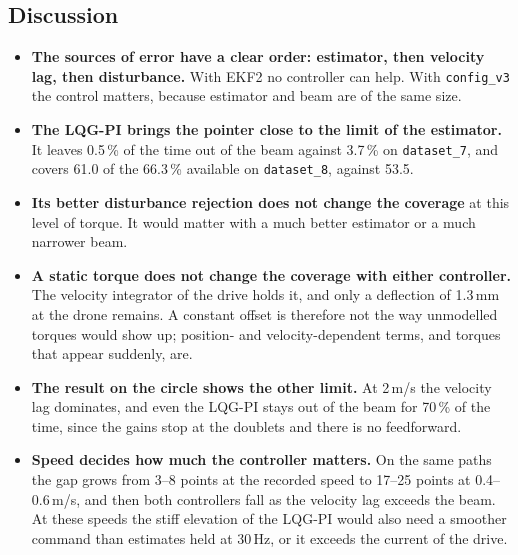 \subsection{Discussion}\label{sec:tp_discussion}
\begin{itemize}
\item \textbf{The sources of error have a clear order: estimator, then velocity lag, then disturbance.} With EKF2 no controller can help. With \texttt{config\_v3} the control matters, because estimator and beam are of the same size.
\item \textbf{The LQG-PI brings the pointer close to the limit of the estimator.} It leaves 0.5\,\% of the time out of the beam against 3.7\,\% on \texttt{dataset\_7}, and covers 61.0 of the 66.3\,\% available on \texttt{dataset\_8}, against 53.5.
\item \textbf{Its better disturbance rejection does not change the coverage} at this level of torque. It would matter with a much better estimator or a much narrower beam.
\item \textbf{A static torque does not change the coverage with either controller.} The velocity integrator of the drive holds it, and only a deflection of 1.3\,mm at the drone remains. A constant offset is therefore not the way unmodelled torques would show up; position- and velocity-dependent terms, and torques that appear suddenly, are.
\item \textbf{The result on the circle shows the other limit.} At 2\,m/s the velocity lag dominates, and even the LQG-PI stays out of the beam for 70\,\% of the time, since the gains stop at the doublets and there is no feedforward.
\item \textbf{Speed decides how much the controller matters.} On the same paths the gap grows from 3--8 points at the recorded speed to 17--25 points at 0.4--0.6\,m/s, and then both controllers fall as the velocity lag exceeds the beam. At these speeds the stiff elevation of the LQG-PI would also need a smoother command than estimates held at 30\,Hz, or it exceeds the current of the drive.
\end{itemize}

